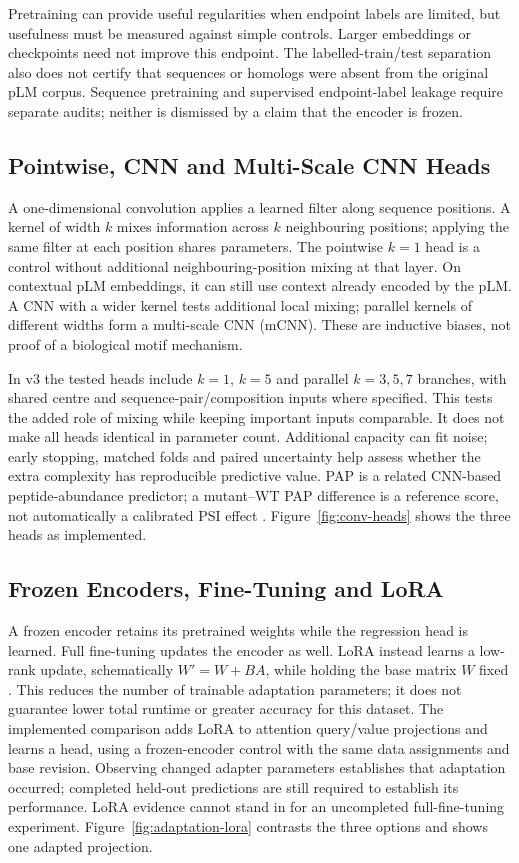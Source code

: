 Pretraining can provide useful regularities when endpoint labels are limited, but usefulness must be
measured against simple controls. Larger embeddings or checkpoints need not improve this endpoint.
The labelled-train/test separation also does not certify that sequences or homologs were absent from
the original pLM corpus. Sequence pretraining and supervised endpoint-label leakage require separate
audits; neither is dismissed by a claim that the encoder is frozen.

\subsection{Pointwise, CNN and Multi-Scale CNN Heads}
A one-dimensional convolution applies a learned filter along sequence positions. A kernel of width
$k$ mixes information across $k$ neighbouring positions; applying the same filter at each position
shares parameters. The pointwise $k=1$ head is a control without additional neighbouring-position
mixing at that layer. On contextual pLM embeddings, it can still use context already encoded by the
pLM. A CNN with a wider kernel tests additional local mixing; parallel kernels of different widths form
a multi-scale CNN (mCNN). These are inductive biases, not proof of a biological motif mechanism.

In v3 the tested heads include $k=1$, $k=5$ and parallel $k=3,5,7$ branches, with shared centre and
sequence-pair/composition inputs where specified. This tests the added role of mixing while keeping
important inputs comparable. It does not make all heads identical in parameter count. Additional
capacity can fit noise; early stopping, matched folds and paired uncertainty help assess whether the
extra complexity has reproducible predictive value. PAP is a related CNN-based peptide-abundance
predictor; a mutant--WT PAP difference is a reference score, not automatically a calibrated PSI effect
\citep{voutsinos2026}. Figure~\ref{fig:conv-heads} shows the three heads as implemented.

\subsection{Frozen Encoders, Fine-Tuning and LoRA}
A frozen encoder retains its pretrained weights while the regression head is learned. Full fine-tuning
updates the encoder as well. LoRA instead learns a low-rank update, schematically
$W'=W+BA$, while holding the base matrix $W$ fixed \citep{hu2022lora}. This reduces the number of
trainable adaptation parameters; it does not guarantee lower total runtime or greater accuracy for this
dataset. The implemented comparison adds LoRA to attention query/value projections and learns a
head, using a frozen-encoder control with the same data assignments and base revision. Observing
changed adapter parameters establishes that adaptation occurred; completed held-out predictions are
still required to establish its performance. LoRA evidence cannot stand in for an uncompleted
full-fine-tuning experiment. Figure~\ref{fig:adaptation-lora} contrasts the three options and shows
one adapted projection.

